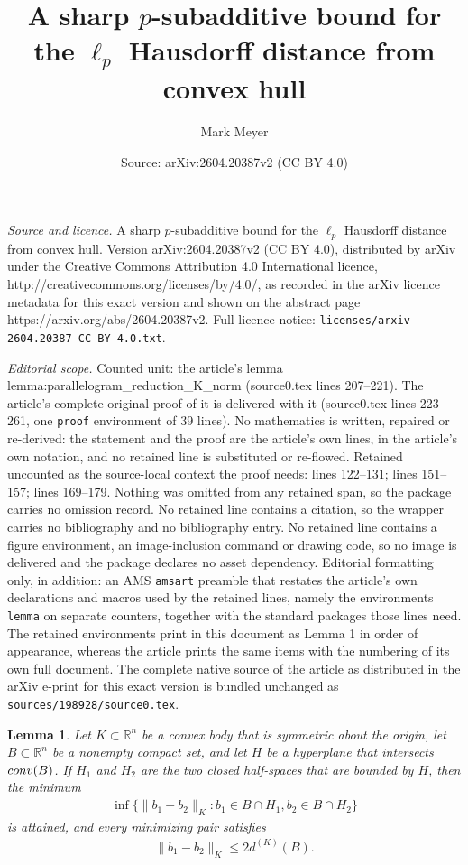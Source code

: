 \documentclass[10pt,a4paper]{amsart}
\title{A sharp $p$-subadditive bound for the $\ell_p$ Hausdorff distance from convex hull}
\author{Mark Meyer}
\date{Source: arXiv:2604.20387v2 (CC BY 4.0)}
\newtheorem{lemma}{Lemma}
\begin{document}
\maketitle

\noindent\emph{Source and licence.} A sharp $p$-subadditive bound for the $\ell_p$ Hausdorff distance from convex hull. Version arXiv:2604.20387v2 (CC BY 4.0), distributed by arXiv under the Creative Commons Attribution 4.0 International licence, http://creativecommons.org/licenses/by/4.0/, as recorded in the arXiv licence metadata for this exact version and shown on the abstract page https://arxiv.org/abs/2604.20387v2. Full licence notice: \texttt{licenses/arxiv-2604.20387-CC-BY-4.0.txt}.\par\smallskip

\noindent\textit{Editorial scope.} Counted unit: the article's lemma lemma:parallelogram\_reduction\_K\_norm (source0.tex lines 207--221). The article's complete original proof of it is delivered with it (source0.tex lines 223--261, one \texttt{proof} environment of 39 lines). No mathematics is written, repaired or re-derived: the statement and the proof are the article's own lines, in the article's own notation, and no retained line is substituted or re-flowed.  Retained uncounted as the source-local context the proof needs: lines 122--131; lines 151--157; lines 169--179.  Nothing was omitted from any retained span, so the package carries no omission record.  No retained line contains a citation, so the wrapper carries no bibliography and no bibliography entry.  No retained line contains a figure environment, an image-inclusion command or drawing code, so no image is delivered and the package declares no asset dependency.  Editorial formatting only, in addition: an AMS \texttt{amsart} preamble that restates the article's own declarations and macros used by the retained lines, namely the environments \texttt{lemma} on separate counters, together with the standard packages those lines need.  The retained environments print in this document as Lemma 1 in order of appearance, whereas the article prints the same items with the numbering of its own full document.  The complete native source of the article as distributed in the arXiv e-print for this exact version is bundled unchanged as \texttt{sources/198928/source0.tex}.
\begin{lemma}\label{lemma:opposite_hyperplane}
    Let $K\subset\mathbb{R}^n$ be a convex body that is symmetric about the origin, let $B\subset\mathbb{R}^n$ be a nonempty compact set, and let $H$ be a hyperplane that intersects $\textup{conv}(B)$. If $H_1$ and $H_2$ are the two closed half-spaces that are bounded by $H$, then the minimum
    \begin{align*}
        \inf\{\|b_1-b_2\|_K:b_1\in B\cap H_1,b_2\in B\cap H_2\}
    \end{align*}
    is attained, and every minimizing pair satisfies 
    \begin{align*}
        \|b_1-b_2\|_K\leq 2d^{(K)}(B).
    \end{align*}
\end{lemma}
\end{document}
